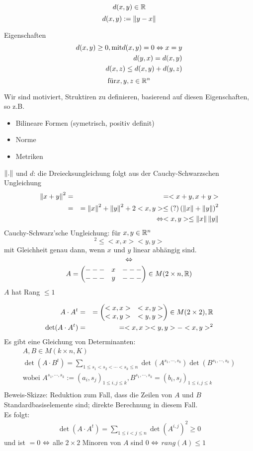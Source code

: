 \[d(x,y)\in\mathbb{R}\]
\[d(x,y):=\left\| y-x \right\|\]
\begin{parquote}{Eigenschaften}
\begin{align*}
  d(x,y)\geq0, \text{mit}d(x,y)=0 \Leftrightarrow x=y\\
  d(y,x)=d(x,y)\\
  d(x,z)\leq d(x,y)+d(y,z)
\end{align*}
\[\text{für} x,y,z\in\mathbb{R}^n\]
\end{parquote}
Wir sind motiviert, Struktiren zu definieren, basierend auf diesen Eigenschaften, so z.B.
\begin{itemize}
  \item Bilineare Formen (symetrisch, positiv definit)
  \item Norme
  \item Metriken
\end{itemize}
\begin{Bew}{1} $\left\| . \right\|$ und $d$: die Dreiecksungleichung folgt aus der Cauchy-Schwarzschen Ungleichung
\begin{align*}
  \left\| x+y \right\|^2&=&=<x+y,x+y>\\
  &=&=\left\| x \right\|^2+\left\| y \right\|^2+2<x,y> \leq (?) \left(\left\| x \right\|+\left\| y \right\|\right)^2\\
  &&\Leftrightarrow <x,y> \leq \left\| x \right\|\left\| y \right\|
\end{align*}
Cauchy-Schwarz'sche Ungleichung: für $x,y\in\mathbb{R}^n$
\[<x,y>^2\leq<x,x><y,y>\]
mit Gleichheit genau dann, wenn $x$ und $y$ linear abhängig sind.
\[\Leftrightarrow\]
\[A=\begin{pmatrix}---&x&---\\---&y&---\end{pmatrix}\in M(2\times n,\mathbb{R})\]
$A$ hat Rang $\leq 1$
\end{Bew}
\begin{Bew}{2}
\begin{align*}
  A\cdot{}A^t&=&=\begin{pmatrix}<x,x>&<x,y>\\<x,y>&<y,y>\end{pmatrix}\in M(2\times 2),\mathbb{R}\\
  \det(A\cdot{}A^t)&=&=<x,x><y,y>-<x,y>^2
\end{align*}
Es gibt eine Gleichung von Determinanten:
\begin{align*}
  A,B\in M(k\times n,K)\\
  \det(A\cdot B^t)=\sum_{1\leq s_1 <s_2<\cdots<s_k\leq n} \det(A^{s_1,\cdots,s_k})\det(B^{s_1,\cdots,s_k})\\
  \text{wobei } A^{s_1,\cdots,s_k}:=(a_i,s_j)_{1\leq i,j\leq k}, B^{s_1,\cdots,s_k}=(b_i,s_j)_{1\leq i,j\leq k}\\
\end{align*}
Beweis-Skizze: Reduktion zum Fall, dass die Zeilen von $A$ und $B$ Standardbasiselemente sind; direkte Berechnung in diesem Fall.\\
Es folgt:
\begin{align*}
  \det(A\cdot A^t)=\sum_{1\leq i < j \leq n} \det(A^{i,j})^2 \geq 0
\end{align*}
und ist $=0$ $\Leftrightarrow$ alle $2\times 2$ Minoren von $A$ sind 0 $\Leftrightarrow$ $rang(A)\leq 1$
\end{Bew}

